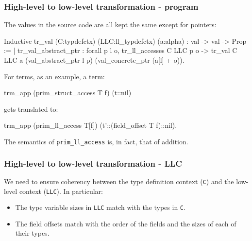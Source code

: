 \begin{frame}[fragile]
\frametitle{High-level to low-level transformation - program}

The values in the source code  are all kept the same except for pointers:

\begin{coqs}
  Inductive tr_val (C:typdefctx) (LLC:ll_typdefctx) (a:alpha) : val -> val -> Prop :=
	  | tr_val_abstract_ptr : forall p l o,
          tr_ll_accesses C LLC p o ->
      	  tr_val C LLC a (val_abstract_ptr l p) (val_concrete_ptr (a[l] + o)).
\end{coqs}

\bigskip \pause

For terms, as an example, a term:

\begin{coqs}
  trm_app (prim_struct_access T f) (t::nil)
\end{coqs}

gets translated to:

\begin{coqs}
  trm_app (prim_ll_access T[f]) (t'::(field_offset T f)::nil).
\end{coqs}

\bigskip \pause

The semantics of \texttt{prim\_ll\_access} is, in fact, that of addition.

\end{frame}


\begin{frame}[fragile]
\frametitle{High-level to low-level transformation - LLC}

We need to ensure coherency between the type definition context (\texttt{C}) and the low-level context (\texttt{LLC}). In particular:

\begin{itemize}
	\item The type variable sizes in \texttt{LLC} match with the types in \texttt{C}.
	\item The field offsets match with the order of the fields and the sizes of each of their types.
\end{itemize}

\end{frame}



